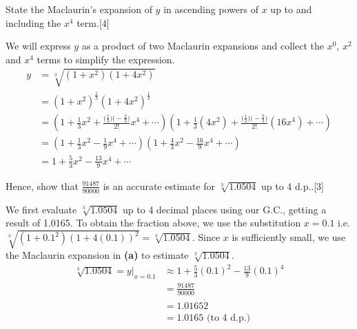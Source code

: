 \documentclass[12pt, a4 paper]{article}
\begin{document}
\begin{outline}[enumerate]
 \2 State the Maclaurin's expansion of \(y\) in ascending powers of \(x\) up to and including the \(x^4\) term.\hfill[4]
 \begin{answer}
  We will express \(y\) as a product of two Maclaurin expansions and collect the \(x^0\), \(x^2\) and \(x^4\) terms to simplify the expression.
  \begin{align*}
   y & =\sqrt[3]{(1+x^2)(1+4x^2)}                                                                                                                                                            \\
     & = {(1+x^2)}^{\frac{1}{3}}{(1+4x^2)}^{\frac{1}{3}}                                                                                                                                     \\
     & = \left(1+\frac{1}{3}x^2+\frac{\big(\frac{1}{3})\big(-\frac{2}{3})}{2!}x^4+\cdots\right)\left(1+\frac{1}{3}(4x^2)+\frac{\big(\frac{1}{3})\big(-\frac{2}{3})}{2!}(16x^4)+\cdots\right) \\
     & = \left(1+\frac{1}{3}x^2-\frac{1}{9}x^4+\cdots\right)\left(1+\frac{4}{3}x^2-\frac{16}{9}x^4+\cdots\right)                                                                             \\
     & = 1 + \frac{5}{3}x^2 - \frac{13}{9}x^4 +\cdots
  \end{align*}
 \end{answer}
 \2 Hence, show that \(\frac{91487}{90000}\) is an accurate estimate for \(\sqrt[3]{1.0504}\)  up to 4 d.p..\hfill[3]
 \begin{answer}
  We first evaluate \(\sqrt[3]{1.0504}\) up to 4 decimal places using our G.C., getting a result of 1.0165. To obtain the fraction above, we use the substitution \(x=0.1\) i.e. \(\sqrt[3]{(1+0.1^2){(1+4(0.1))}^2}=\sqrt[3]{1.0504}\). Since \(x\) is sufficiently small, we use the Maclaurin expansion in \textbf{(a)} to estimate \(\sqrt[3]{1.0504}\).
  \begin{align*}
   \sqrt[3]{1.0504} = \left.y\right|_{x=0.1} & \approx 1 + \frac{5}{3}{(0.1)}^2 - \frac{13}{9}{(0.1)}^4 \\
                                             & = \frac{91487}{90000}                                    \\
                                             & = 1.0165\dot{2}                                          \\
                                             & = 1.0165 \textrm{ (to 4 d.p.)}
  \end{align*}
 \end{answer}


\end{outline}
\end{document}
